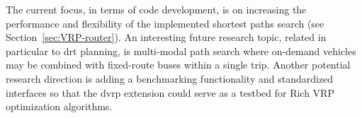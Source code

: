 The current focus, in terms of code development, is on increasing the performance and flexibility of the implemented shortest paths search (see Section~\ref{sec:VRP-router}). An interesting future research topic, related in particular to \gls{drt} planning, is multi-modal path search where on-demand vehicles may be combined with fixed-route buses within a single trip. Another potential research direction is adding a benchmarking functionality and standardized interfaces so that the \gls{dvrp} extension could serve as a testbed for Rich VRP optimization algorithms.

